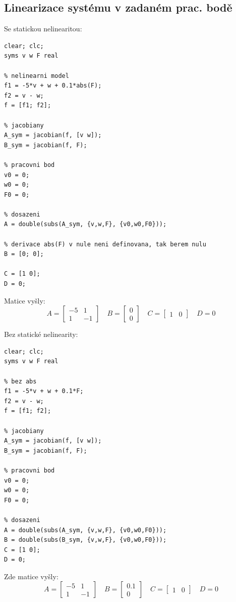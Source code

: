 \documentclass[a4paper,12pt]{article}
\begin{document}
\subsection{Linearizace systému v zadaném prac. bodě}
Se statickou nelinearitou: 
\begin{lstlisting}
clear; clc;
syms v w F real

% nelinearni model
f1 = -5*v + w + 0.1*abs(F);
f2 = v - w;
f = [f1; f2];

% jacobiany
A_sym = jacobian(f, [v w]);
B_sym = jacobian(f, F);

% pracovni bod
v0 = 0;
w0 = 0;
F0 = 0;

% dosazeni
A = double(subs(A_sym, {v,w,F}, {v0,w0,F0}));

% derivace abs(F) v nule neni definovana, tak berem nulu
B = [0; 0];

C = [1 0];
D = 0;
\end{lstlisting}

Matice vyšly:
$$
A=\begin{bmatrix}-5 & 1 \\ 1 & -1\end{bmatrix}
\quad
B=\begin{bmatrix}0 \\ 0\end{bmatrix}
\quad
C=\begin{bmatrix}1 & 0\end{bmatrix}
\quad
D=0
$$

Bez statické nelinearity:
\begin{lstlisting}
clear; clc;
syms v w F real

% bez abs
f1 = -5*v + w + 0.1*F;
f2 = v - w;
f = [f1; f2];

% jacobiany
A_sym = jacobian(f, [v w]);
B_sym = jacobian(f, F);

% pracovni bod
v0 = 0;
w0 = 0;
F0 = 0;

% dosazeni
A = double(subs(A_sym, {v,w,F}, {v0,w0,F0}));
B = double(subs(B_sym, {v,w,F}, {v0,w0,F0}));
C = [1 0];
D = 0;
\end{lstlisting}
Zde matice vyšly:
$$
A=\begin{bmatrix}-5 & 1 \\ 1 & -1\end{bmatrix}
\quad
B=\begin{bmatrix}0.1 \\ 0\end{bmatrix}
\quad
C=\begin{bmatrix}1 & 0\end{bmatrix}
\quad
D=0
$$
\end{document}

